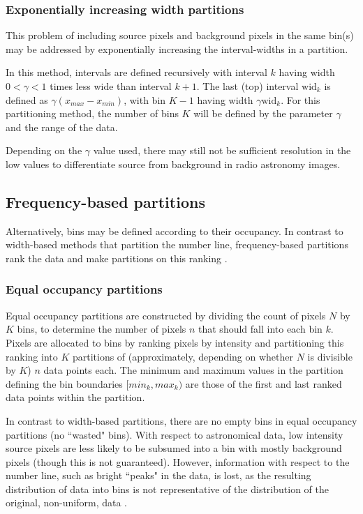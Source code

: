 \subsubsection{Exponentially increasing width partitions}
This problem of including source pixels and background pixels in the same bin(s) may be addressed by exponentially increasing the interval-widths in a partition. 

In this method, intervals are defined recursively with interval $k$ having width $0 < \gamma < 1$ times less wide than interval $k+1$. The last (top) interval $\text{wid}_k$ is defined as $\gamma(x_{max}-x_{min})$, with bin $K-1$ having width $\gamma \text{wid}_k$. For this partitioning method, the number of bins $K$ will be defined by the parameter $\gamma$ and the range of the data.

Depending on the $\gamma$ value used, there may still not be sufficient resolution in the low values to differentiate source from background in radio astronomy images.

\subsection{Frequency-based partitions}\label{sec:occ}
Alternatively, bins may be defined according to their occupancy. In contrast to width-based methods that partition the number line, frequency-based partitions rank the data and make partitions on this ranking \cite{yang2010discretization}.

\subsubsection{Equal occupancy partitions}
Equal occupancy partitions are constructed by dividing the count of pixels $N$ by $K$ bins, to determine the number of pixels $n$ that should fall into each bin $k$. Pixels are allocated to bins by ranking pixels by intensity and partitioning this ranking into $K$ partitions of (approximately, depending on whether $N$ is divisible by $K$) $n$ data points each. The minimum and maximum values in the partition defining the bin boundaries $[min_k, max_k)$ are those of the first and last ranked data points within the partition.

In contrast to width-based partitions, there are no empty bins in equal occupancy partitions (no ``wasted" bins). With respect to astronomical data, low intensity source pixels are less likely to be subsumed into a bin with mostly background pixels (though this is not guaranteed). However, information with respect to the number line, such as bright ``peaks" in the data, is lost, as the resulting distribution of data into bins is not representative of the distribution of the original, non-uniform, data \cite{clarke2000entropy}.

